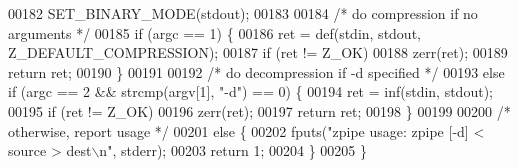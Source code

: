 \begin{DoxyCode}
00182     SET\_BINARY\_MODE(stdout);
00183 
00184     \textcolor{comment}{/* do compression if no arguments */}
00185     \textcolor{keywordflow}{if} (argc == 1) \{
00186         ret = def(stdin, stdout, Z\_DEFAULT\_COMPRESSION);
00187         \textcolor{keywordflow}{if} (ret != Z\_OK)
00188             zerr(ret);
00189         \textcolor{keywordflow}{return} ret;
00190     \}
00191 
00192     \textcolor{comment}{/* do decompression if -d specified */}
00193     \textcolor{keywordflow}{else} \textcolor{keywordflow}{if} (argc == 2 && strcmp(argv[1], \textcolor{stringliteral}{"-d"}) == 0) \{
00194         ret = inf(stdin, stdout);
00195         \textcolor{keywordflow}{if} (ret != Z\_OK)
00196             zerr(ret);
00197         \textcolor{keywordflow}{return} ret;
00198     \}
00199 
00200     \textcolor{comment}{/* otherwise, report usage */}
00201     \textcolor{keywordflow}{else} \{
00202         fputs(\textcolor{stringliteral}{"zpipe usage: zpipe [-d] < source > dest\(\backslash\)n"}, stderr);
00203         \textcolor{keywordflow}{return} 1;
00204     \}
00205 \}
\end{DoxyCode}
